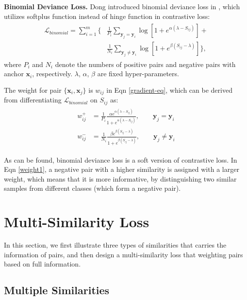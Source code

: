 \documentclass[10pt,twocolumn,letterpaper]{article}
\def\vx{{\bm{x}}}
\def\vy{{\bm{y}}}
\begin{document}
{\bf Binomial Deviance Loss.}
 Dong \etal introduced binomial deviance loss in \cite{binomial}, which utilizes softplus function instead of hinge function in contrastive loss:
\begin{align}
\begin{split}
\label{bin-equation}
\mathcal{L}_{binomial} = \sum_{i=1}^m  \bigg\{&{}\frac{1}{{P_i}}{\sum_{\vy_j=\vy_i } \log \left[1 + e^{\alpha (\lambda - S_{ij})}
\right] }  + \\
&{}  \frac{1}{N_i} \sum_{\vy_j \neq \vy_i} \log \left[1+
e^{\beta (S_{ij} - \lambda)}\right] \bigg\},
\end{split}
\end{align}
where ${P_i}$ and ${N_i}$ denote the numbers of positive pairs and negative pairs with anchor $\vx_i$, respectively. $\lambda$, $\alpha$, $\beta$ are fixed hyper-parameters.

The weight for pair $\{\vx_i, \vx_j\}$ is $w_{ij}$  in Eqn \ref{gradient-eq}, which can be derived from differentiating $\mathcal{L}_{binomial}$ on $S_{ij}$ as:
\begin{align}
\label{bin-weight-eq}
\begin{split}
	w^{+}_{ij} &{}= \frac{1}{P_i} \frac{\alpha e^{\alpha\left(\lambda - S_{ij} \right)}}
		{1 + e^{ \alpha\left(\lambda - S_{ij} \right) }},  \quad   \quad  \vy_j = \vy_i\\
	w^{-}_{ij} &{}= \frac{1}{N_i} \frac{\beta e ^{ \beta \left(S_{ij} - \lambda \right)}}{1 + e^{\beta \left(S_{ij} - \lambda\right)}}, \quad  \quad \vy_j\neq\vy_i
\end{split}
\end{align}

As can be found, binomial deviance loss is a soft version of contrastive loss. In Eqn \ref{weight1}, a negative pair with a higher similarity is assigned with a larger weight, which means that it is more informative, by distinguishing two similar samples from different classes (which form a negative pair).

\section{Multi-Similarity Loss}
In this section, we first illustrate three types of similarities that carries the information of pairs, and then design a multi-similarity loss that weighting pairs based on full information.

\subsection{Multiple Similarities}
\end{document}
